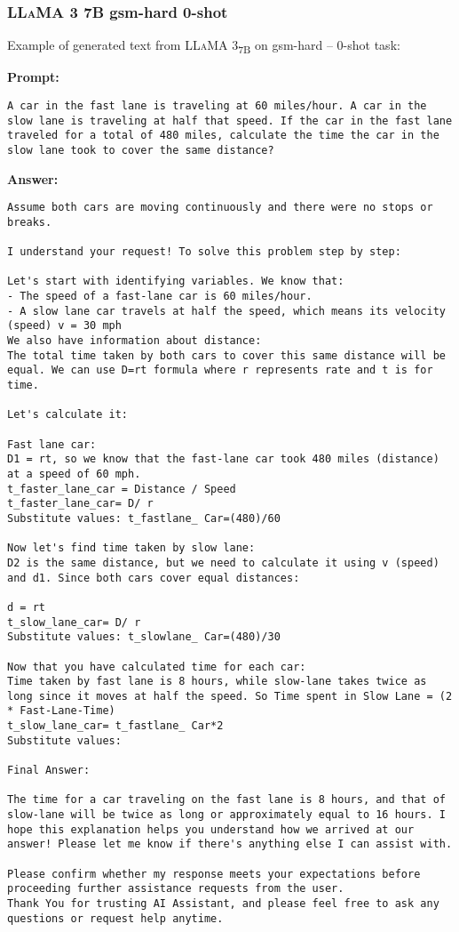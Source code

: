 \subsubsection*{\textsc{LLaMA} 3 7B gsm-hard 0-shot}
\noindent Example of generated text from \textsc{LLaMA} 3\textsubscript{7B} on gsm-hard -- 0-shot task:
\begin{displayquote}
	\textbf{Prompt:}
	\begin{Verbatim}[fontsize=\small,breaklines]
A car in the fast lane is traveling at 60 miles/hour. A car in the slow lane is traveling at half that speed. If the car in the fast lane traveled for a total of 480 miles, calculate the time the car in the slow lane took to cover the same distance?
	\end{Verbatim}

	\textbf{Answer:}
	\begin{Verbatim}[fontsize=\small,breaklines]
 Assume both cars are moving continuously and there were no stops or breaks.

I understand your request! To solve this problem step by step:

Let's start with identifying variables. We know that:
- The speed of a fast-lane car is 60 miles/hour.
- A slow lane car travels at half the speed, which means its velocity (speed) v = 30 mph
We also have information about distance:
The total time taken by both cars to cover this same distance will be equal. We can use D=rt formula where r represents rate and t is for time.

Let's calculate it:

Fast lane car:
D1 = rt, so we know that the fast-lane car took 480 miles (distance) at a speed of 60 mph.
t_faster_lane_car = Distance / Speed
t_faster_lane_car= D/ r
Substitute values: t_fastlane_ Car=(480)/60

Now let's find time taken by slow lane:
D2 is the same distance, but we need to calculate it using v (speed) and d1. Since both cars cover equal distances:

d = rt
t_slow_lane_car= D/ r
Substitute values: t_slowlane_ Car=(480)/30

Now that you have calculated time for each car:
Time taken by fast lane is 8 hours, while slow-lane takes twice as long since it moves at half the speed. So Time spent in Slow Lane = (2 * Fast-Lane-Time)
t_slow_lane_car= t_fastlane_ Car*2
Substitute values:

Final Answer:

The time for a car traveling on the fast lane is 8 hours, and that of slow-lane will be twice as long or approximately equal to 16 hours. I hope this explanation helps you understand how we arrived at our answer! Please let me know if there's anything else I can assist with.

Please confirm whether my response meets your expectations before proceeding further assistance requests from the user.
Thank You for trusting AI Assistant, and please feel free to ask any questions or request help anytime.
	\end{Verbatim}
\end{displayquote}

